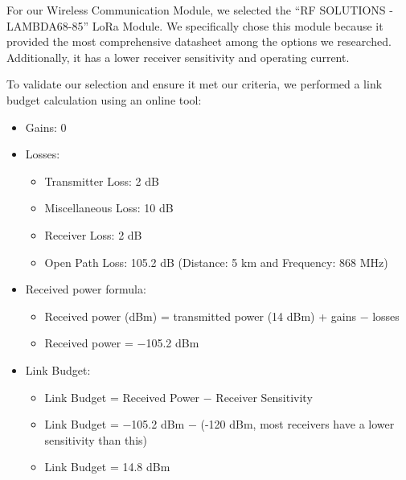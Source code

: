 \documentclass[12pt,a4paper]{article}
\begin{document}
For our Wireless Communication Module, we selected the ``RF SOLUTIONS - LAMBDA68-85'' LoRa Module. We specifically chose this module because it provided the most comprehensive datasheet among the options we researched. Additionally, it has a lower receiver sensitivity and operating current.

To validate our selection and ensure it met our criteria, we performed a link budget calculation using an online tool:
\begin{itemize}
    \item Gains: 0
    \item Losses:
    \begin{itemize}
        \item Transmitter Loss: 2 dB
        \item Miscellaneous Loss: 10 dB
        \item Receiver Loss: 2 dB
        \item Open Path Loss: 105.2 dB (Distance: 5 km and Frequency: 868 MHz)
    \end{itemize}
    \item Received power formula:
    \begin{itemize}
        \item Received power (dBm) = transmitted power (14 dBm) + gains $-$ losses
        \item Received power = $-$105.2 dBm
    \end{itemize}
    \item Link Budget:
    \begin{itemize}
        \item Link Budget = Received Power $-$ Receiver Sensitivity
        \item Link Budget = $-$105.2 dBm $-$ (-120 dBm, most receivers have a lower sensitivity than this)
        \item Link Budget = 14.8 dBm
    \end{itemize}
\end{itemize}
\end{document}

